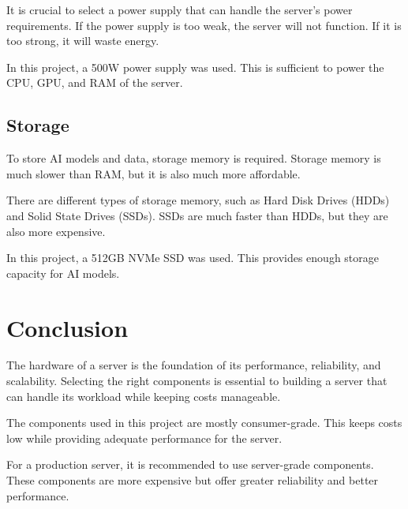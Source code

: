 It is crucial to select a power supply that can handle the server's power requirements. If the power supply is too weak, the server will not function. If it is too strong, it will waste energy.

In this project, a 500W power supply was used. This is sufficient to power the CPU, GPU, and RAM of the server.

\cite{PowerSupply}

\subsection{Storage}

To store AI models and data, storage memory is required. Storage memory is much slower than RAM, but it is also much more affordable. 

There are different types of storage memory, such as Hard Disk Drives (HDDs) and Solid State Drives (SSDs). SSDs are much faster than HDDs, but they are also more expensive.

In this project, a 512GB NVMe SSD was used. This provides enough storage capacity for AI models.

\cite{DataStorage}

\section{Conclusion}

The hardware of a server is the foundation of its performance, reliability, and scalability. Selecting the right components is essential to building a server that can handle its workload while keeping costs manageable.

The components used in this project are mostly consumer-grade. This keeps costs low while providing adequate performance for the server.

For a production server, it is recommended to use server-grade components. These components are more expensive but offer greater reliability and better performance.
